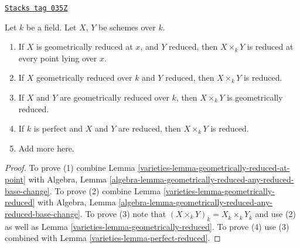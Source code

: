 \begin{lemma}
\label{varieties-lemma-geometrically-reduced-any-base-change}
\href{https://stacks.math.columbia.edu/tag/035Z}{\texttt{Stacks tag 035Z}}

Let $k$ be a field. Let $X$, $Y$ be schemes over $k$.
\begin{enumerate}
\item If $X$ is geometrically reduced at $x$, and $Y$ reduced,
then $X \times_k Y$ is reduced at every point lying over $x$.
\item If $X$ geometrically reduced over $k$ and $Y$ reduced, then
$X \times_k Y$ is reduced.
\item If $X$ and $Y$ are geometrically reduced over $k$, then
$X \times_k Y$ is geometrically reduced.
\item If $k$ is perfect and $X$ and $Y$ are reduced, then
$X \times_k Y$ is reduced.
\item Add more here.
\end{enumerate}
\end{lemma}

\begin{proof}

To prove (1) combine Lemma \ref{varieties-lemma-geometrically-reduced-at-point}
with Algebra, Lemma
\ref{algebra-lemma-geometrically-reduced-any-reduced-base-change}.
To prove (2) combine Lemma \ref{varieties-lemma-geometrically-reduced}
with Algebra, Lemma
\ref{algebra-lemma-geometrically-reduced-any-reduced-base-change}.
To prove (3) note that
$(X \times_k Y)_{\overline{k}} =
X_{\overline{k}} \times_{\overline{k}} Y_{\overline{k}}$
and use (2) as well as Lemma \ref{varieties-lemma-geometrically-reduced}.
To prove (4) use (3) combined with Lemma \ref{varieties-lemma-perfect-reduced}.
\end{proof}

